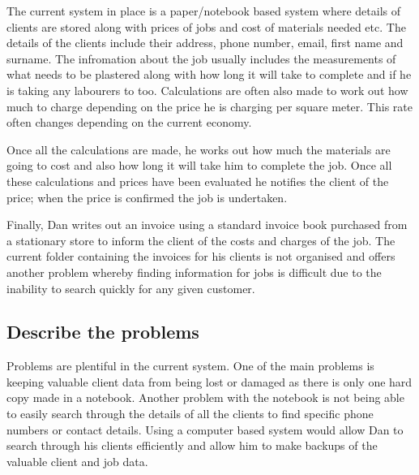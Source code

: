 	\begin{flushleft}

	The current system in place is a paper/notebook based system where details of clients are stored along with prices of jobs and cost of materials needed etc. The details of the clients include their address, phone number, email, first name and surname. The infromation about the job usually includes the measurements of what needs to be plastered along with how long it will take to complete and if he is taking any labourers to too. Calculations are often also made to work out how much to charge depending on the price he is charging per square meter. This rate often changes depending on the current economy. \par

Once all the calculations are made, he works out how much the materials are going to cost and also how long it will take him to complete the job. Once all these calculations and prices have been evaluated he notifies the client of the price; when the price is confirmed the job is undertaken.	 \par

Finally, Dan writes out an invoice using a standard invoice book purchased from a stationary store to inform the client of the costs and charges of the job. The current folder containing the invoices for his clients is not organised and offers another problem whereby finding information for jobs is difficult due to the inability to search quickly for any given customer.
		
	




	\end{flushleft}

\subsection{Describe the problems}


	\begin{flushleft}
	
	Problems are plentiful in the current system. One of the main problems is keeping valuable client data from being lost or damaged as there is only one hard copy made in a notebook. Another problem with the notebook is not being able to easily search through the details of all the clients to find specific phone numbers or contact details. Using a computer based system would allow Dan to search through his clients efficiently and allow him to make backups of the valuable client and job data. \par 
		



	
	\end{flushleft}

